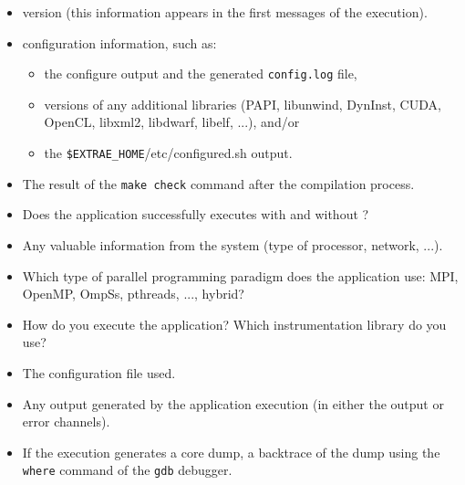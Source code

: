 \begin{itemize}
\item \TRACE version (this information appears in the first messages of the execution).
\item \TRACE configuration information, such as:
\begin{itemize}
  \item the configure output and the generated \texttt{config.log} file,
  \item versions of any additional libraries (PAPI, libunwind, DynInst, CUDA, OpenCL, libxml2, libdwarf, libelf, ...), and/or
  \item the \texttt{\$EXTRAE\_HOME}/etc/configured.sh output.
\end{itemize}
\item The result of the \texttt{make check} command after the \TRACE compilation process.
\item Does the application successfully executes with and without \TRACE?
\item Any valuable information from the system (type of processor, network, ...).
\item Which type of parallel programming paradigm does the application use: MPI, OpenMP, OmpSs, pthreads, ..., hybrid?
\item How do you execute the application? Which instrumentation library do you use?
\item The \TRACE configuration file used.
\item Any output generated by the application execution (in either the output or error channels).
\item If the execution generates a core dump, a backtrace of the dump using the \texttt{where} command of the \texttt{gdb} debugger.

\end{itemize}
